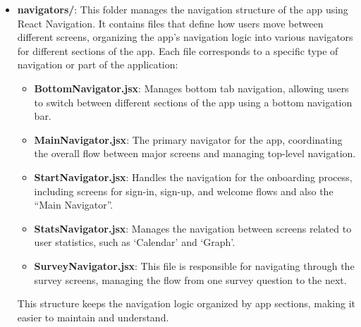 \begin{itemize}
    \item \textbf{navigators/}: This folder manages the navigation structure of the app using React Navigation. It contains files that define how users move between different screens, organizing the app's navigation logic into various navigators for different sections of the app. Each file corresponds to a specific type of navigation or part of the application:
    
    \begin{itemize}
        \item \textbf{BottomNavigator.jsx}: Manages bottom tab navigation, allowing users to switch between different sections of the app using a bottom navigation bar.
        \item \textbf{MainNavigator.jsx}: The primary navigator for the app, coordinating the overall flow between major screens and managing top-level navigation.
        \item \textbf{StartNavigator.jsx}: Handles the navigation for the onboarding process, including screens for sign-in, sign-up, and welcome flows and also the ``Main Navigator''.
        \item \textbf{StatsNavigator.jsx}: Manages the navigation between screens related to user statistics, such as `Calendar' and `Graph'.
        \item \textbf{SurveyNavigator.jsx}: This file is responsible for navigating through the survey screens, managing the flow from one survey question to the next.
    \end{itemize}

    \noindent This structure keeps the navigation logic organized by app sections, making it easier to maintain and understand.


\end{itemize}
